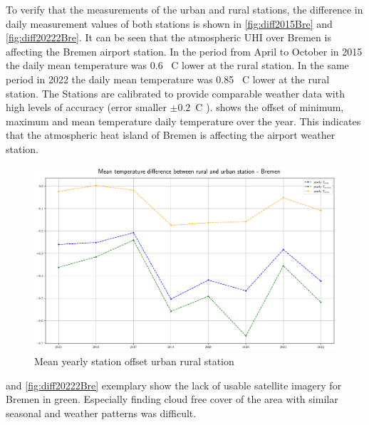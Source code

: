 \documentclass[12pt,a4paper, english,twoside]{scrartcl}
\begin{document}
      To verify that the measurements of the urban and rural stations, the difference in daily measurement values of both stations is shown in \cref{fig:diff2015Bre} and \cref{fig:diff20222Bre}. 
      It can be seen that the atmospheric \gls{UHI} over Bremen is affecting the Bremen airport station. 
      In the period from April to October in 2015 the daily mean temperature was 0.6 \textdegree\ C lower at the rural station. 
      In the same period in 2022 the daily mean temperature was 0.85 \textdegree\ C lower at the rural station. 
      The Stations are calibrated to provide comparable weather data with high levels of accuracy (error smaller $\pm 0.2$\textdegree\ C \autocite{LES2024}). 
       shows the offset of minimum, maximum and mean temperature daily temperature over the year. 
      This indicates that the atmospheric heat island of Bremen is affecting the airport weather station.
    \begin{figure}[!htbp]
      \begin{center}
        \includegraphics[width=\textwidth]{img/Mean temperature difference between rural and urban station - Bremen.png}
         \end{center}
         \caption{Mean yearly station offset urban rural station}\label{fig:tempurbvsrural}
      \end{figure}
      \noindent
       and \cref{fig:diff20222Bre} exemplary show the lack of usable satellite imagery for Bremen in green. 
      Especially finding cloud free cover of the area with similar seasonal and weather patterns was difficult.
      
\end{document}
